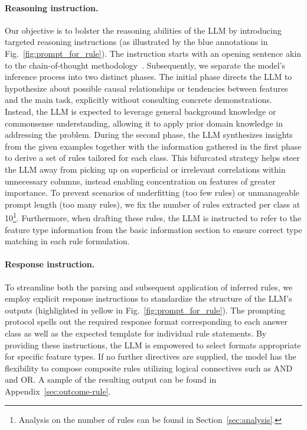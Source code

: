 \paragraph{Reasoning instruction.} Our objective is to bolster the reasoning abilities of the LLM by introducing targeted reasoning instructions (as illustrated by the blue annotations in Fig.~\ref{fig:prompt_for_rule}). The instruction starts with an opening sentence akin to the chain-of-thought methodology~\cite{wei2022chain}. Subsequently, we separate the model's inference process into two distinct phases. The initial phase directs the LLM to hypothesize about possible causal relationships or tendencies between features and the main task, explicitly without consulting concrete demonstrations. Instead, the LLM is expected to leverage general background knowledge or commonsense understanding, allowing it to apply prior domain knowledge in addressing the problem. During the second phase, the LLM synthesizes insights from the given examples together with the information gathered in the first phase to derive a set of rules tailored for each class. This bifurcated strategy helps steer the LLM away from picking up on superficial or irrelevant correlations within unnecessary columns, instead enabling concentration on features of greater importance. To prevent scenarios of underfitting (too few rules) or unmanageable prompt length (too many rules), we fix the number of rules extracted per class at 10\footnote{Analysis on the number of rules can be found in Section~\ref{sec:analysis}.}. Furthermore, when drafting these rules, the LLM is instructed to refer to the feature type information from the basic information section to ensure correct type matching in each rule formulation.

\vspace*{-0.12in}
\paragraph{Response instruction.} To streamline both the parsing and subsequent application of inferred rules, we employ explicit response instructions to standardize the structure of the LLM’s outputs (highlighted in yellow in Fig.~\ref{fig:prompt_for_rule}). The prompting protocol spells out the required response format corresponding to each answer class as well as the expected template for individual rule statements. By providing these instructions, the LLM is empowered to select formats appropriate for specific feature types. If no further directives are supplied, the model has the flexibility to compose composite rules utilizing logical connectives such as AND and OR. A sample of the resulting output can be found in Appendix~\ref{sec:outcome-rule}.

